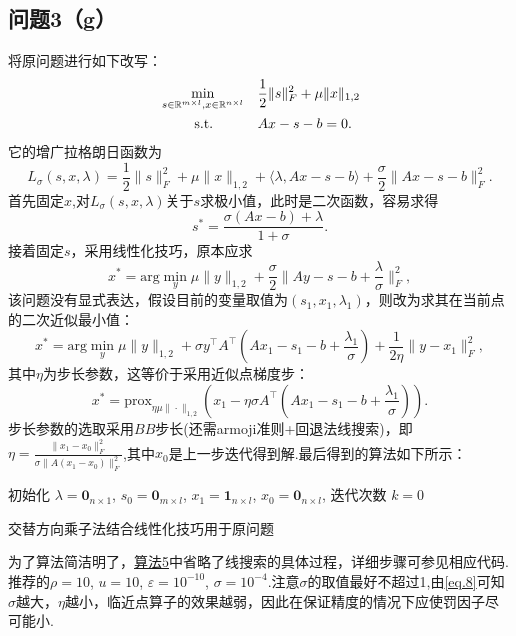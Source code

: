 \documentclass[10pt,a4paper]{article}
\begin{document}
\subsection{问题3（g）}
将原问题进行如下改写：
\begin{equation*}
	\begin{aligned}
		&\min_{s\in\mathbb{R}^{m\times l},x\in\mathbb{R}^{n\times l}}  &&\frac{1}{2}\|s\|_F^2+\mu\|x\|_{1,2}\\
		&\text{\quad\quad\, s.t.} &&Ax-s-b=0.
	\end{aligned}
\end{equation*}
 它的增广拉格朗日函数为
 $$L_{\sigma}(s,x,\lambda)=\frac{1}{2}\|s\|_F^2+\mu\|x\|_{1,2}+\langle\lambda, Ax-s-b\rangle+\frac{\sigma}{2}\|Ax-s-b\|_{F}^{2}.$$
 首先固定$x$,对$L_{\sigma}(s,x,\lambda)$关于$s$求极小值，此时是二次函数，容易求得
 $$s^*=\frac{\sigma(Ax-b)+\lambda}{1+\sigma}.$$
 接着固定$s$，采用线性化技巧，原本应求
 $$x^*=\text{arg}\min_{y}\mu\|y\|_{1,2}+\frac{\sigma}{2}\|Ay-s-b+\frac{\lambda}{\sigma}\|_{F}^{2},$$
 该问题没有显式表达，假设目前的变量取值为$(s_1,x_1,\lambda_1)$，则改为求其在当前点的二次近似最小值：
 $$x^*=\text{arg}\min_{y} \mu\|y\|_{1,2}+\sigma y^{\top}A^{\top}(Ax_1-s_1-b+\frac{\lambda_1}{\sigma})+\frac{1}{2\eta}\|y-x_1\|_{F}^{2},$$
 其中$\eta$为步长参数，这等价于采用近似点梯度步：
 \begin{equation}
 	 x^*=\text{prox}_{\eta\mu\|\cdot\|_{1,2}}\left( x_1-\eta\sigma A^{\top}(Ax_1-s_1-b+\frac{\lambda_1}{\sigma})\right).
 	 \label{eq.8}
 \end{equation}
 步长参数的选取采用$BB$步长(还需armoji准则+回退法线搜索)，即$\eta=\frac{\|x_1-x_0\|_{F}^{2}}{\sigma\|A(x_1-x_0)\|_{F}^{2}}$,其中$x_0$是上一步迭代得到解.最后得到的算法如下所示：\\
 \begin{algorithm}[H]
 	\SetAlgoLined
 	\DontPrintSemicolon
 	初始化 $\lambda = \mathbf{0}_{n\times 1}$, $s_{0} = \mathbf{0}_{m\times l}$, $x_{1} = \mathbf{1}_{n\times l}$, $x_{0}=\mathbf{0}_{n\times l}$, 迭代次数 $k=0$\;
 	\caption{交替方向乘子法结合线性化技巧用于原问题}
 	\label{alg:5}
 \end{algorithm}
 为了算法简洁明了，\hyperref[alg:5]{算法5}中省略了线搜索的具体过程，详细步骤可参见相应代码.推荐的$\rho=10$, $u=10$, $\varepsilon=10^{-10}$, $\sigma=10^{-4}$.注意$\sigma$的取值最好不超过1,由\eqref{eq.8}可知$\sigma$越大，$\eta$越小，临近点算子的效果越弱，因此在保证精度的情况下应使罚因子尽可能小.
\end{document}
